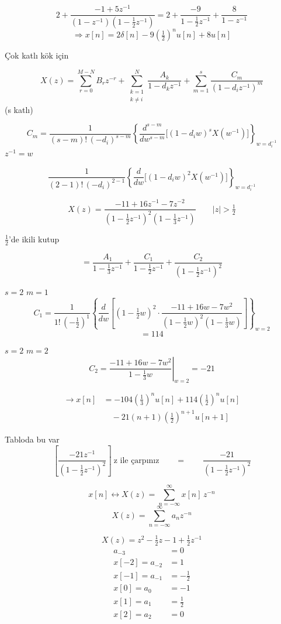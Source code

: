 \documentclass[11pt,a4paper]{article}
\begin{document}
\[ 2 + \frac{-1+5z^{-1}}{(1-z^{-1})\left(1-\frac12 z^{-1}\right)} = 2 + \frac{-9}{1-\frac12 z^{-1}} + \frac{8}{1-z^{-1}} \]
\[ \Rightarrow x[n] = 2\delta[n] - 9\left(\tfrac12\right)^{n}u[n] + 8u[n] \]

Çok katlı kök için

\[ X(z) = \sum_{r=0}^{M-N} B_r z^{-r} + \sum_{\substack{k=1 \\ k\neq i}}^{N} \frac{A_k}{1-d_k z^{-1}} + \sum_{m=1}^{s} \frac{C_m}{\left(1-d_i z^{-1}\right)^{m}} \]
(s katlı)

\[ C_m = \frac{1}{(s-m)!\,(-d_i)^{s-m}} \left\{ \frac{d^{s-m}}{dw^{s-m}} \Big[ (1-d_i w)^{s} X(w^{-1}) \Big] \right\}_{w=d_i^{-1}} \]
$z^{-1}=w$

\[ \frac{1}{(2-1)!\,(-d_i)^{2-1}} \left\{ \frac{d}{dw} \Big[ (1-d_i w)^{2} X(w^{-1}) \Big] \right\}_{w=d_i^{-1}} \]

\[ X(z) = \frac{-11+16z^{-1}-7z^{-2}}{\left(1-\frac12 z^{-1}\right)^{2}\left(1-\frac13 z^{-1}\right)} \qquad |z|>\tfrac12 \]

$\tfrac12$'de ikili kutup

\[ = \frac{A_1}{1-\frac13 z^{-1}} + \frac{C_1}{1-\frac12 z^{-1}} + \frac{C_2}{\left(1-\frac12 z^{-1}\right)^{2}} \]

$s=2$ \quad $m=1$
\[ C_1 = \frac{1}{1!\,\left(-\frac12\right)^{1}} \left\{ \frac{d}{dw}\left[ \left(1-\tfrac12 w\right)^{2}\cdot\frac{-11+16w-7w^{2}}{\left(1-\frac12 w\right)^{2}\left(1-\frac13 w\right)} \right] \right\}_{w=2} \]
\[ = 114 \]

$s=2$ \quad $m=2$
\[ C_2 = \left.\frac{-11+16w-7w^{2}}{1-\frac13 w}\right|_{w=2} = -21 \]

\[ \begin{aligned}
\to x[n] &= -104\left(\tfrac13\right)^{n}u[n] + 114\left(\tfrac12\right)^{n}u[n] \\
&\quad - 21(n+1)\left(\tfrac12\right)^{n+1}u[n+1]
\end{aligned} \]

Tabloda bu var
\[ \left[\frac{-21z^{-1}}{\left(1-\frac12 z^{-1}\right)^{2}}\right] \ \text{z ile çarpınız} \qquad = \qquad \frac{-21}{\left(1-\frac12 z^{-1}\right)^{2}} \]

\[ x[n] \longleftrightarrow X(z) = \sum_{n=-\infty}^{\infty} x[n]\,z^{-n} \]
\[ X(z) = \sum_{n=-\infty}^{\infty} a_n z^{-n} \]

\[ X(z) = z^{2} - \tfrac12 z - 1 + \tfrac12 z^{-1} \]
\[ \begin{aligned}
a_{-3} &= 0 \\
x[-2] = a_{-2} &= 1 \\
x[-1] = a_{-1} &= -\tfrac12 \\
x[0] = a_{0} &= -1 \\
x[1] = a_{1} &= \tfrac12 \\
x[2] = a_{2} &= 0
\end{aligned} \]
\end{document}
